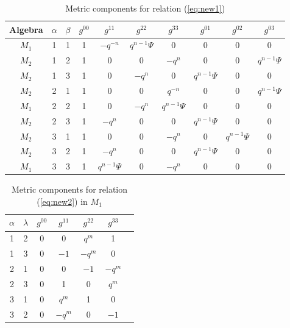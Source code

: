 \documentclass[12pt,a4paper]{article}
\theoremstyle{plain}
\theoremstyle{definition}
\begin{document}
\begin{table}[H]
\centering
\small
\caption{Metric components for relation (\ref{eq:new1})}
\label{tab:app-new1}
\begin{tabular}{|c|c|c|c|c|c|c|c|c|c|}
\hline
Algebra & $\alpha$ & $\beta$ & $g^{00}$ & $g^{11}$ & $g^{22}$ & $g^{33}$ & $g^{01}$ & $g^{02}$ & $g^{03}$ \\
\hline
$M_1$ & 1 & 1 & 1 & $-q^{-n}$ & $q^{n-1}\Psi$ & 0 & 0 & 0 & 0 \\
\hline
$M_2$ & 1 & 2 & 1 & 0 & 0 & $-q^{n}$ & 0 & 0 & $q^{n-1}\Psi$ \\
\hline
$M_2$ & 1 & 3 & 1 & 0 & $-q^{n}$ & 0 & $q^{n-1}\Psi$ & 0 & 0 \\
\hline
$M_2$ & 2 & 1 & 1 & 0 & 0 & $q^{-n}$ & 0 & 0 & $q^{n-1}\Psi$ \\
\hline
$M_1$ & 2 & 2 & 1 & 0 & $-q^{n}$ & $q^{n-1}\Psi$ & 0 & 0 & 0 \\
\hline
$M_2$ & 2 & 3 & 1 & $-q^{n}$ & 0 & 0 & $q^{n-1}\Psi$ & 0 & 0 \\
\hline
$M_2$ & 3 & 1 & 1 & 0 & 0 & $-q^{n}$ & 0 & $q^{n-1}\Psi$ & 0 \\
\hline
$M_2$ & 3 & 2 & 1 & $-q^{n}$ & 0 & 0 & $q^{n-1}\Psi$ & 0 & 0 \\
\hline
$M_1$ & 3 & 3 & 1 & $q^{n-1}\Psi$ & 0 & $-q^{n}$ & 0 & 0 & 0 \\
\hline
\end{tabular}
\end{table}

\begin{table}[H]
\centering
\small
\caption{Metric components for relation (\ref{eq:new2}) in $M_1$}
\label{tab:app-new2-m1}
\begin{tabular}{|c|c|c|c|c|c|c|}
\hline
$\alpha$ & $\lambda$ & $g^{00}$ & $g^{11}$ & $g^{22}$ & $g^{33}$ \\
\hline
1 & 2 & 0 & 0 & $q^{m}$ & 1 \\
\hline
1 & 3 & 0 & $-1$ & $-q^{m}$ & 0 \\
\hline
2 & 1 & 0 & 0 & $-1$ & $-q^{m}$ \\
\hline
2 & 3 & 0 & 1 & 0 & $q^{m}$ \\
\hline
3 & 1 & 0 & $q^{m}$ & 1 & 0 \\
\hline
3 & 2 & 0 & $-q^{m}$ & 0 & $-1$ \\
\hline
\end{tabular}
\end{table}
\end{document}
